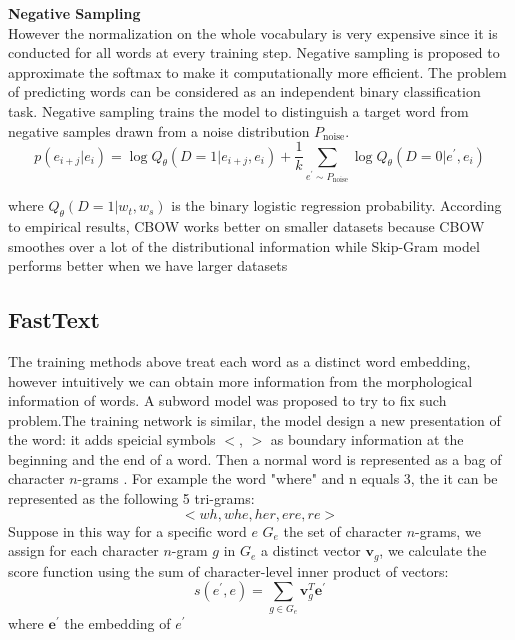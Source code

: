 \textbf{Negative Sampling}\\
However the normalization on the whole vocabulary is very expensive since it is conducted for all words at every training step. Negative sampling is proposed to approximate the softmax to make it computationally more efficient. The problem of predicting words can be considered as an independent binary classification task. Negative sampling trains the model to distinguish a target word from negative samples drawn from a noise  distribution $P_{\text{noise}}$.   
\[p(e_{i+j}|e_i) = \log {Q_{\theta}{(D=1 | e_{i+j}, e_i)}} + \frac{1}{k}\sum_{e^{\prime} \sim P_{\text{noise}}} {\log{Q_{\theta}{(D=0 | e^{\prime}, e_i )}}}  \]

where ${Q_{\theta}{(D=1| w_t, w_s)}}$ is the binary logistic regression probability.
According to  empirical results, CBOW works better on smaller datasets because CBOW smoothes over a lot of the distributional information while Skip-Gram model performs better when we have larger datasets

\subsection{FastText}
The training methods above treat each word as a distinct word embedding, however intuitively we can obtain more information from the morphological information of words. A subword model was proposed to try to fix such problem.The training network is similar, the model design a new presentation of the word: it adds speicial symbols $<$, ${>}$ as boundary information at the beginning and the end of a word. Then a normal word is represented as a bag of character $n$-grams . For example the word "where" and n equals 3, the it can be represented as the following 5 tri-grams: 
\[ <wh, whe, her, ere, re>\]
Suppose in this way for a specific word $e$ ${G_{e}}$ the set of character ${n}$-grams, we assign for each character ${n}$-gram $g$ in ${G_{e}}$ a distinct vector $\bm{v}_g$, we calculate the score function using the sum of character-level inner product of vectors:
\[s(e^{\prime}, e) = \sum_{g \in G_{e}} \bm{v}_g^{T} \bm{e}^{\prime} \]
where $\bm{e}^{\prime}$ the embedding of $e^{\prime}$
